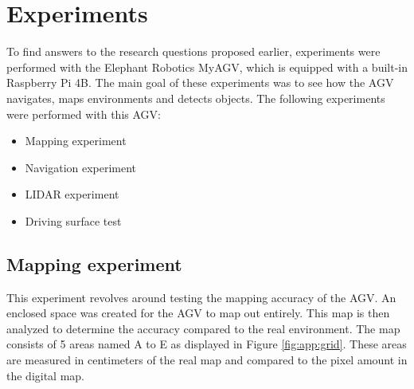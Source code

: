 \section{Experiments}

To find answers to the research questions proposed earlier, experiments were performed with the Elephant Robotics MyAGV, which is equipped with a built-in Raspberry Pi 4B. The main goal of these experiments was to see how the AGV navigates, maps environments and detects objects.
The following experiments were performed with this AGV:
\begin{itemize}
    \item Mapping experiment
    \item Navigation experiment
    \item LIDAR experiment
    \item Driving surface test
\end{itemize}

\subsection{Mapping experiment}
This experiment revolves around testing the mapping accuracy of the AGV. An enclosed space was created for the AGV to map out entirely. This map is then analyzed to determine the accuracy compared to the real environment.
The map consists of 5 areas named A to E as displayed in Figure \ref{fig:app:grid}. These areas are measured in centimeters of the real map and compared to the pixel amount in the digital map.

